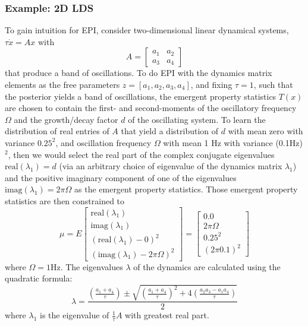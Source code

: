\documentclass[11pt]{article}
\begin{document}
\subsubsection{Example: 2D LDS}\label{methods_2DLDS}
To gain intuition for EPI, consider two-dimensional linear dynamical systems, $\tau \dot{x} = Ax$ with 
\[A = \begin{bmatrix} a_1 & a_2 \\ a_3 & a_4 \end{bmatrix}\]
 that produce a band of oscillations. To do EPI with the dynamics matrix elements as the free parameters $z = \left[a_1, a_2, a_3, a_4 \right]$, and fixing $\tau=1$, such that the posterior yields a band of oscillations, the emergent property statistics $T(x)$ are chosen to contain the first- and second-moments of the oscillatory frequency $\Omega$ and the growth/decay factor $d$ of the oscillating system.  To learn the distribution of real entries of $A$ that yield a distribution of $d$ with mean zero with variance $0.25^2$, and oscillation frequency $\Omega$ with mean 1 Hz with variance (0.1Hz)$^2$, then we would select the real part of the complex conjugate eigenvalues $\text{real}(\lambda_1) = d$ (via an arbitrary choice of eigenvalue of the dynamics matrix $\lambda_1$) and the positive imaginary component of one of the eigenvalues $\text{imag}(\lambda_1) = 2 \pi \Omega$ as the emergent property statistics.  Those emergent property statistics are then constrained to
\begin{equation}
 \mu = E \begin{bmatrix} \text{real}(\lambda_1) \\ \text{imag}(\lambda_1) \\ (\text{real}(\lambda_1)-0)^2  \\ (\text{imag}(\lambda_1)-2 \pi \Omega)^2 \end{bmatrix} = \begin{bmatrix} 0.0 \\ 2 \pi \Omega \\ 0.25^2 \\ (2 \pi 0.1)^2 \end{bmatrix}
 \end{equation} 
where $\Omega = 1$Hz.  The eigenvalues $\lambda$ of the dynamics are calculated using the quadratic formula: 
\begin{equation}
\lambda = \frac{(\frac{a_1 + a_4}{\tau}) \pm \sqrt{(\frac{a_1+a_4}{\tau})^2 + 4(\frac{a_2 a_3 - a_1 a_4}{\tau})}}{2}
\end{equation}
where $\lambda_1$ is the eigenvalue of $\frac{1}{\tau}A$ with greatest real part.
\end{document}
